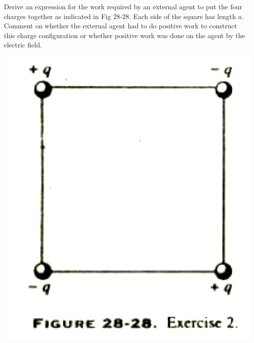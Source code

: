 \documentclass[11pt,letterpaper,boxed]{hmcpset}
\begin{document}
	
	\begin{problem}[HRK E28.2]
		Derive an expression for the work required by an external agent to put the four charges together as indicated in Fig 28-28. Each side of the square has length $a$. Comment on whether the external
		agent had to do positive work to construct this charge configuration
		or whether positive work was done on the agent by the electric field.
		
		\begin{center}
			\includegraphics[scale=0.4]{28-28.png}
		\end{center}
		
	
		
	\end{problem}
	
	\begin{solution}
		\vfill
	\end{solution}
	\newpage
	
\end{document}
